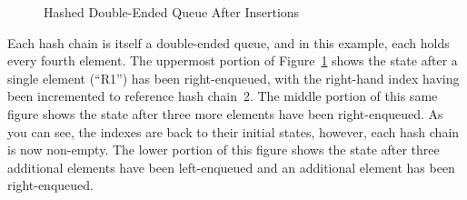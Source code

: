 \begin{figure}[tb]
\begin{center}
\end{center}
\caption{Hashed Double-Ended Queue After Insertions}
\label{fig:SMPdesign:Hashed Double-Ended Queue After Insertions}
\end{figure}

Each hash chain is itself a double-ended queue, and in this example,
each holds every fourth element.
The uppermost portion of
Figure~\ref{fig:SMPdesign:Hashed Double-Ended Queue After Insertions}
shows the state after a single element (``R1'') has been
right-enqueued, with the right-hand index having been incremented to
reference hash chain~2.
The middle portion of this same figure shows the state after
three more elements have been right-enqueued.
As you can see, the indexes are back to their initial states, however,
each hash chain is now non-empty.
The lower portion of this figure shows the state after three additional
elements have been left-enqueued and an additional element has been
right-enqueued.

